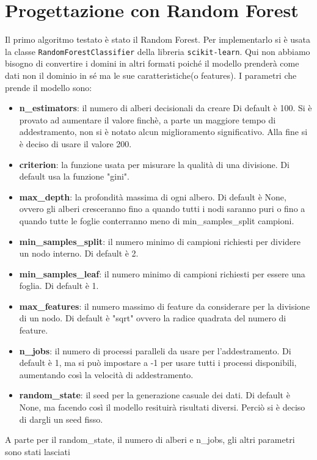 \documentclass[12pt,a4paper,openright,twoside]{book}
\begin{document}
\section{Progettazione con Random Forest}

Il primo algoritmo testato è stato il Random Forest.
Per implementarlo si è usata la classe \texttt{RandomForestClassifier} della libreria
\texttt{scikit-learn}.
Qui non abbiamo bisogno di convertire i domini in
altri formati poiché il modello prenderà
come dati non il dominio in sé ma le sue caratteristiche(o features).
I parametri che prende il modello sono:
\begin{itemize}
    \item \textbf{n\_estimators}: il numero di alberi decisionali da creare
    Di default è 100. Si è provato ad aumentare il valore finchè, a parte un maggiore
    tempo di addestramento, non si è notato alcun miglioramento significativo.
    Alla fine si è deciso di usare il valore 200.
    \item \textbf{criterion}: la funzione usata per misurare la qualità di una divisione.
    Di default usa la funzione "gini".
    \item \textbf{max\_depth}: la profondità massima di ogni albero.
    Di default è None, ovvero gli alberi cresceranno fino a quando
    tutti i nodi saranno puri o fino a quando tutte le foglie
    conterranno meno di min\_samples\_split campioni.
    \item \textbf{min\_samples\_split}: il numero minimo di campioni richiesti
    per dividere un nodo interno. Di default è 2.
    \item \textbf{min\_samples\_leaf}: il numero minimo di campioni richiesti
    per essere una foglia. Di default è 1.
    \item \textbf{max\_features}: il numero massimo di feature da considerare
    per la divisione di un nodo. Di default è "sqrt" ovvero la radice quadrata
    del numero di feature.
    \item \textbf{n\_jobs}: il numero di processi paralleli da usare per l'addestramento.
    Di default è 1, ma si può impostare a -1 per usare tutti i processi disponibili, 
    aumentando così la velocità di addestramento.
    \item \textbf{random\_state}: il seed per la generazione casuale dei dati.
    Di default è None, ma facendo così il modello resituirà risultati diversi.
    Perciò si è deciso di dargli un seed fisso.
\end{itemize}
A parte per il random\_state, il numero di alberi e n\_jobs, gli altri parametri sono stati lasciati
\end{document}
